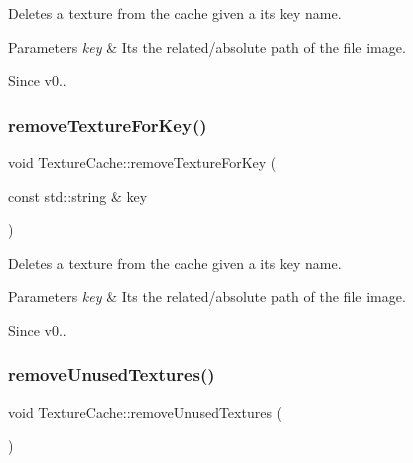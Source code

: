 Deletes a texture from the cache given a its key name. 
\begin{DoxyParams}{Parameters}
{\em key} & It\textquotesingle{}s the related/absolute path of the file image. \\
\hline
\end{DoxyParams}
\begin{DoxySince}{Since}
v0.. 
\end{DoxySince}
\mbox{\label{classTextureCache_ad532b26bf9a162d34710aa38f776c134}} 
\subsubsection{\texorpdfstring{remove\+Texture\+For\+Key()}{removeTextureForKey()}\hspace{0.1cm}{\footnotesize\ttfamily [2/2]}}
{\footnotesize\ttfamily void Texture\+Cache\+::remove\+Texture\+For\+Key (\begin{DoxyParamCaption}\item[{const std\+::string \&}]{key }\end{DoxyParamCaption})}

Deletes a texture from the cache given a its key name. 
\begin{DoxyParams}{Parameters}
{\em key} & It\textquotesingle{}s the related/absolute path of the file image. \\
\hline
\end{DoxyParams}
\begin{DoxySince}{Since}
v0.. 
\end{DoxySince}
\mbox{\label{classTextureCache_acbec791c5421295c030e097716787f68}} 
\subsubsection{\texorpdfstring{remove\+Unused\+Textures()}{removeUnusedTextures()}\hspace{0.1cm}{\footnotesize\ttfamily [1/2]}}
{\footnotesize\ttfamily void Texture\+Cache\+::remove\+Unused\+Textures (\begin{DoxyParamCaption}{ }\end{DoxyParamCaption})}

